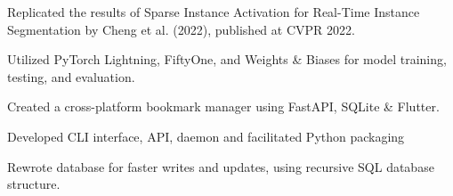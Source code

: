 \documentclass[]{resume-template}
\begin{document}
\begin{minipage}[t]{0.66\textwidth}
  \label{subsec:sparseinst}
  \begin{tightemize}
  \item Replicated the results of Sparse Instance Activation for
    Real-Time Instance Segmentation by Cheng et al. (2022), published
    at CVPR 2022.
  \item Utilized PyTorch Lightning, FiftyOne, and Weights \& Biases
    for model training, testing, and evaluation.

  \end{tightemize}
  \label{subsec: Bookie}
  \begin{tightemize}
  \item Created a cross-platform bookmark manager using FastAPI,
    SQLite \& Flutter.
  \item Developed CLI interface, API, daemon and facilitated Python packaging
  \item Rewrote database for faster writes and updates, using
    recursive SQL database structure. \\
  \end{tightemize}


\end{minipage}
\end{document}
